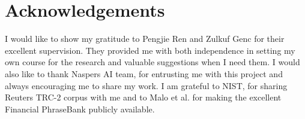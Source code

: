 \documentclass[../main.tex]{subfiles}
\begin{document}
\section{Acknowledgements}
I would like to show my gratitude to Pengjie Ren and Zulkuf Genc for their excellent supervision. They provided me with both independence in setting my own course for the research and valuable suggestions when I need them. I would also like to thank Naspers AI team, for entrusting me with this project and always encouraging me to share my work. I am grateful to NIST, for sharing Reuters TRC-2 corpus with me and to Malo et al. for making the excellent Financial PhraseBank publicly available.
\end{document}
